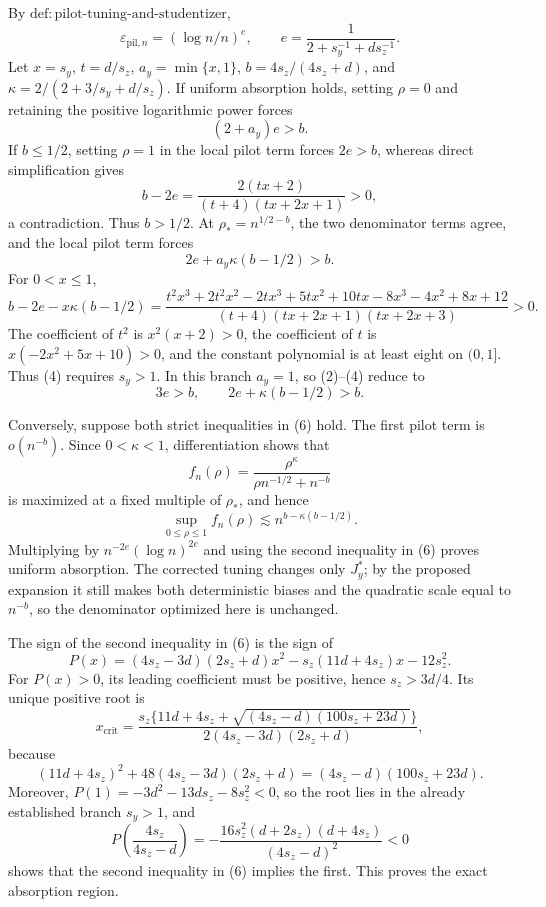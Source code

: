 By \(\mathrm{def{:}pilot\text{-}tuning\text{-}and\text{-}studentizer}\),
\[
\varepsilon_{\mathrm{pil},n}=(\log n/n)^e,
\qquad
e=\frac1{2+s_y^{-1}+ds_z^{-1}}.                                  \tag{1}
\]
Let \(x=s_y\), \(t=d/s_z\), \(a_y=\min\{x,1\}\), \(b=4s_z/(4s_z+d)\), and \(\kappa=2/(2+3/s_y+d/s_z)\). If uniform absorption holds, setting \(\rho=0\) and retaining the positive logarithmic power forces
\[
(2+a_y)e>b.                                                       \tag{2}
\]
If \(b\le1/2\), setting \(\rho=1\) in the local pilot term forces \(2e>b\), whereas direct simplification gives
\[
b-2e=\frac{2(tx+2)}{(t+4)(tx+2x+1)}>0,                           \tag{3}
\]
a contradiction. Thus \(b>1/2\). At \(\rho_*=n^{1/2-b}\), the two denominator terms agree, and the local pilot term forces
\[
2e+a_y\kappa(b-1/2)>b.                                           \tag{4}
\]
For \(0<x\le1\),
\[
b-2e-x\kappa(b-1/2)
=\frac{t^2x^3+2t^2x^2-2tx^3+5tx^2+10tx-8x^3-4x^2+8x+12}
{(t+4)(tx+2x+1)(tx+2x+3)}>0.                                    \tag{5}
\]
The coefficient of \(t^2\) is \(x^2(x+2)>0\), the coefficient of \(t\) is \(x(-2x^2+5x+10)>0\), and the constant polynomial is at least eight on \((0,1]\). Thus (4) requires \(s_y>1\). In this branch \(a_y=1\), so (2)--(4) reduce to
\[
3e>b,
\qquad
2e+\kappa(b-1/2)>b.                                              \tag{6}
\]

Conversely, suppose both strict inequalities in (6) hold. The first pilot term is \(o(n^{-b})\). Since \(0<\kappa<1\), differentiation shows that
\[
f_n(\rho)=\frac{\rho^\kappa}{\rho n^{-1/2}+n^{-b}}
\]
is maximized at a fixed multiple of \(\rho_*\), and hence
\[
\sup_{0\le\rho\le1}f_n(\rho)\lesssim n^{b-\kappa(b-1/2)}.      \tag{7}
\]
Multiplying by \(n^{-2e}(\log n)^{2e}\) and using the second inequality in (6) proves uniform absorption. The corrected tuning changes only \(J_y^*\); by the proposed expansion it still makes both deterministic biases and the quadratic scale equal to \(n^{-b}\), so the denominator optimized here is unchanged.

The sign of the second inequality in (6) is the sign of
\[
P(x)=(4s_z-3d)(2s_z+d)x^2-s_z(11d+4s_z)x-12s_z^2.                \tag{8}
\]
For \(P(x)>0\), its leading coefficient must be positive, hence \(s_z>3d/4\). Its unique positive root is
\[
x_{\mathrm{crit}}=
\frac{s_z\{11d+4s_z+\sqrt{(4s_z-d)(100s_z+23d)}\}}
{2(4s_z-3d)(2s_z+d)},                                             \tag{9}
\]
because
\[
(11d+4s_z)^2+48(4s_z-3d)(2s_z+d)=(4s_z-d)(100s_z+23d).
\]
Moreover, \(P(1)=-3d^2-13ds_z-8s_z^2<0\), so the root lies in the already established branch \(s_y>1\), and
\[
P\!\left(\frac{4s_z}{4s_z-d}\right)
=-\frac{16s_z^2(d+2s_z)(d+4s_z)}{(4s_z-d)^2}<0                  \tag{10}
\]
shows that the second inequality in (6) implies the first. This proves the exact absorption region.

